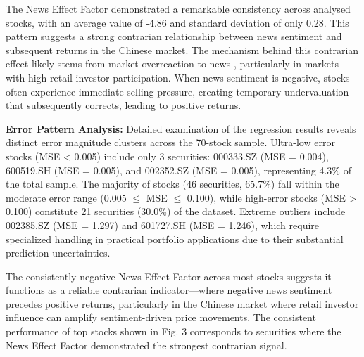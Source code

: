 \documentclass[3p,times,procedia]{elsarticle}
\begin{document}
\begin{table}[!ht]
\centering
\caption{\textbf{Factor Influence Analysis}}
\renewcommand{\arraystretch}{1.3} %
\end{table}

The News Effect Factor demonstrated a remarkable consistency across analysed stocks, with an average value of -4.86 and standard deviation of only 0.28. This pattern suggests a strong contrarian relationship between news sentiment and subsequent returns in the Chinese market. The mechanism behind this contrarian effect likely stems from market overreaction to news \cite{TETLOCK2007}, particularly in markets with high retail investor participation. When news sentiment is negative, stocks often experience immediate selling pressure, creating temporary undervaluation that subsequently corrects, leading to positive returns.

\textbf{Error Pattern Analysis:} Detailed examination of the regression results reveals distinct error magnitude clusters across the 70-stock sample. Ultra-low error stocks (MSE < 0.005) include only 3 securities: 000333.SZ (MSE = 0.004), 600519.SH (MSE = 0.005), and 002352.SZ (MSE = 0.005), representing 4.3\% of the total sample. The majority of stocks (46 securities, 65.7\%) fall within the moderate error range (0.005 $\leq$ MSE $\leq$ 0.100), while high-error stocks (MSE > 0.100) constitute 21 securities (30.0\%) of the dataset. Extreme outliers include 002385.SZ (MSE = 1.297) and 601727.SH (MSE = 1.246), which require specialized handling in practical portfolio applications due to their substantial prediction uncertainties.

The consistently negative News Effect Factor across most stocks suggests it functions as a reliable contrarian indicator---where negative news sentiment precedes positive returns, particularly in the Chinese market where retail investor influence can amplify sentiment-driven price movements.
The consistent performance of top stocks shown in Fig. 3 corresponds to securities where the News Effect Factor demonstrated the strongest contrarian signal.
\end{document}
